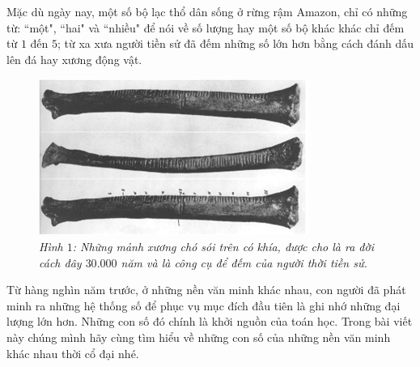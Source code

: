 	\vspace*{50pt}
	Mặc dù ngày nay, một số bộ lạc thổ dân sống ở rừng rậm Amazon, chỉ có những từ: ``một", ``hai" và ``nhiều" để nói về số lượng hay một số bộ khác khác chỉ đếm từ $1$ đến $5$; từ xa xưa người tiền sử đã đếm những số lớn hơn bằng cách đánh dấu lên đá hay xương động vật.
	\vskip 0.1cm
	\begin{figure}
		\centering
		\vspace*{-5pt}
		\captionsetup{labelformat= empty, justification=centering}
		\includegraphics[width=1\linewidth]{1}
		\caption{\textit{\color{toancuabi}Hình $1$: Những mảnh xương chó sói trên có khía, được cho là ra đời cách đây $30{.}000$ năm và là công cụ để đếm của người thời tiền sử.}}
		\vspace*{-25pt}
	\end{figure}
	Từ hàng nghìn năm trước, ở những nền văn minh khác nhau, con người đã phát minh ra những hệ thống số để phục vụ mục đích đầu tiên là ghi nhớ những đại lượng lớn hơn. Những con số đó chính là khởi nguồn của toán học. Trong bài viết này chúng mình hãy cùng tìm hiểu về những con số của những nền văn minh khác nhau thời cổ đại nhé.
